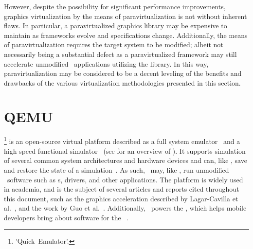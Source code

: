 However, despite the possibility for significant performance improvements, graphics virtualization by the means of paravirtualization is not without inherent flaws.
In particular, a paravirtualized graphics library may be expensive to maintain as frameworks evolve and specifications change.
Additionally, the means of paravirtualization requires the target system to be modified; albeit not necessarily being a substantial defect as a paravirtualized framework may still accelerate unmodified \dvttermtarget\ applications utilizing the library.
In this way, paravirtualization may be considered to be a decent leveling of the benefits and drawbacks of the various virtualization methodologies presented in this section.

\section{QEMU}
\label{sec:backgroundandrelatedwork_qemu}
\dvttermqemu \footnote{'Quick~Emulator'.} is an open-source virtual platform described as a full system emulator~ and a high-speed functional simulator~ (see  for an overview of \dvttermqemu ).
It supports simulation of several common system architectures and hardware devices and can, like \dvttermsimics , save and restore the state of a simulation~.
As such, \dvttermqemu\ may, like \dvttermsimics , run unmodified \dvttermtarget\ software such as \dvttermos s, drivers, and other applications.
The platform is widely used in academia, and is the subject of several articles and reports cited throughout this document, such as the graphics acceleration described by Lagar-Cavilla et al.~, and the work by Guo et al.~.
Additionally, \dvttermqemu\ powers the \dvttermandroidemulator , which helps mobile developers bring about software for the \dvttermandroid\ \dvttermos .

